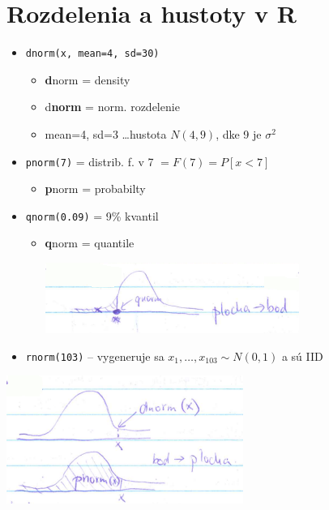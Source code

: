 \documentclass[unknownkeysallowed]{article}
\begin{document}
\section*{Rozdelenia a hustoty v R}
\begin{multicols}{2}
\begin{itemize}
\item \texttt{dnorm(x, mean=4, sd=30)}
	\begin{itemize}
	\item \textbf{d}norm = density
	\item d\textbf{norm} = norm. rozdelenie
	\item mean=4, sd=3 \ldots hustota $N(4,9)$, dke 9 je $\sigma^2$
	\end{itemize}
\item \texttt{pnorm(7)} = distrib. f. v 7 $= F(7) = P[x<7]$
	\begin{itemize}
	\item \textbf{p}norm = probabilty
	\end{itemize}
\item \texttt{qnorm(0.09)} = 9\% kvantil
	\begin{itemize}
	\item \textbf{q}norm = quantile
	
	\includegraphics[width=\linewidth]{imgs/obr9.png}
	\end{itemize}
\item \texttt{rnorm(103)} -- vygeneruje sa $x_1, \ldots, x_{103} \sim N(0,1)$ a sú IID
\end{itemize}
\columnbreak
\includegraphics[width=\linewidth]{imgs/obr8.png}
\end{multicols}
\end{document}
